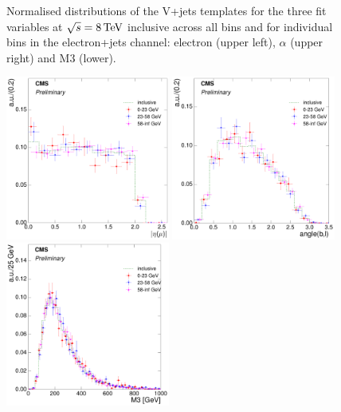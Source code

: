 \begin{figure}[hbtp]
	 \caption{Normalised distributions of the V+jets templates for the three fit variables at $\sqrt{s}=8\,\text{Te\hspace{-.08em}V}$
	 inclusive across all \mt bins and for individual \mt bins in the electron+jets channel: electron \abseta
	 (upper left), $\alpha$ (upper right) and M3 (lower).}
     \label{fig:MT_fit_variable_vjets_comparisons_electron_8TeV}
\end{figure}

\begin{figure}[hbtp]
    \centering
     \includegraphics[width=0.48\textwidth]{Chapters/04_Analysis/04b_XSections/images/8TeV/fit_variables/muon/MT/muon_absolute_eta/vjets/MT_muon_absolute_eta_2orMoreBtags_VJets_template_comparison.pdf}\hfill
     \includegraphics[width=0.48\textwidth]{Chapters/04_Analysis/04b_XSections/images/8TeV/fit_variables/muon/MT/angle_bl/vjets/MT_angle_bl_2orMoreBtags_VJets_template_comparison.pdf}\hfill
     \includegraphics[width=0.48\textwidth]{Chapters/04_Analysis/04b_XSections/images/8TeV/fit_variables/muon/MT/M3/vjets/MT_M3_2orMoreBtags_VJets_template_comparison.pdf}\\

\end{figure}

